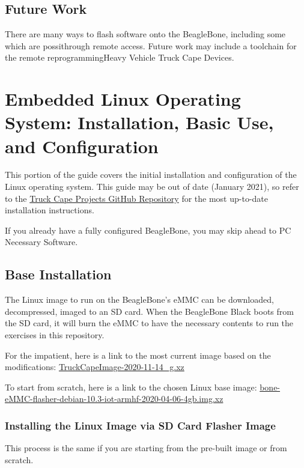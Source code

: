     \subsection{Future Work}
        There are many ways to flash software onto the BeagleBone, including some which are possithrough remote access. Future work may include a toolchain for the remote reprogrammingHeavy Vehicle Truck Cape Devices. 
\section{Embedded Linux Operating System: Installation, Basic Use, and Configuration}
    This portion of the guide covers the initial installation and configuration of the Linux operating system. This guide may be out of date (January 2021), so refer to the \href{https://github.com/SystemsCyber/TruckCapeProjects}{Truck Cape Projects GitHub Repository} for the most up-to-date installation instructions.
    
    If you already have a fully configured BeagleBone, you may skip ahead to PC Necessary Software.

    \subsection{Base Installation}
        The Linux image to run on the BeagleBone's eMMC can be downloaded, decompressed, imaged to an SD card. When the BeagleBone Black boots from the SD card, it will burn the eMMC to have the necessary contents to run the exercises in this repository. 

        For the impatient, here is a link to the most current image based on the modifications: \href{https://www.engr.colostate.edu/~jdaily/files/TruckCapeImage-2020-11-14_4.19.img.xz}{TruckCapeImage-2020-11-14\_g.xz}
        
        To start from scratch, here is a link to the chosen Linux base image:  \href{https://debian.beagleboard.org/images/bone-eMMC-flasher-debian-10.3-iot-armhf-2020-04-06-4gb.img.xz}{bone-eMMC-flasher-debian-10.3-iot-armhf-2020-04-06-4gb.img.xz}
        
        \subsubsection{Installing the Linux Image via SD Card Flasher Image}
            This process is the same if you are starting from the pre-built image or from scratch.
            
